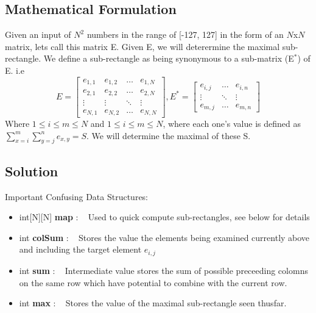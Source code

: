 \documentclass[12pt]{article}
\begin{document}
\newpage

\subsection{Mathematical Formulation}
Given an input of $N^2$ numbers in the range of [-127, 127] in the form of an $N$x$N$
matrix, lets call this matrix E. Given E, we will deterermine the maximal sub-rectangle.
We define a sub-rectangle as being synonymous to a sub-matrix (E$^{\ast}$) of E. i.e
\[ E =
\begin{bmatrix}
    e_{1,1} & e_{1,2} & \dots  & e_{1,N} \\
    e_{2,1} & e_{2,2} & \dots  & e_{2,N} \\
    \vdots  & \vdots  & \ddots & \vdots  \\
    e_{N,1} & e_{N,2} & \dots  & e_{N,N}
\end{bmatrix}
, E^{\ast} =
\begin{bmatrix}
    e_{i,j}     & \dots  & e_{i,n}     \\
    \vdots      & \ddots & \vdots      \\
    e_{m,j}     & \dots  & e_{m,n}
\end{bmatrix}
\]
Where $1 \leq i \leq m \leq N$ and $1 \leq i \leq m \leq N$, where each one's value is defined as
$\sum\limits_{x=i}^{m} \sum\limits_{y=j}^{n} e_{x,y} = S$. We will determine the maximal of these S.


\subsection{Solution}
Important Confusing Data Structures:
\begin{itemize}
    \item int[N][N] \textbf{map} : ~ Used to quick compute sub-rectangles, see below for details
    \item int \textbf{colSum} : ~ Stores the value the elements being examined currently above
        and including the target element $e_{i,j}$
    \item int \textbf{sum} : ~ Intermediate value stores the sum of possible preceeding colomns
        on the same row which have potential to combine with the current row.
    \item int \textbf{max} : ~ Stores the value of the maximal sub-rectangle seen thusfar.
\end{itemize}
\end{document}
